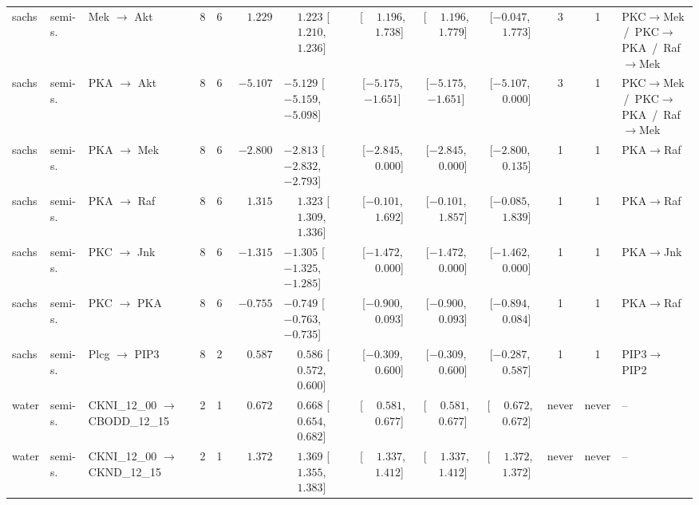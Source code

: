 \begin{landscape}
\begin{longtable}{@{}llp{2.15cm}ccrl cccc c l@{}}
sachs & semi-s. & Mek $\to$ Akt & 8 & 6 & $\phantom{-}1.229$ & $\phantom{-}1.223$ [$\phantom{-}1.210$, $\phantom{-}1.236$] & [$\phantom{-}1.196$, $\phantom{-}1.738$] & [$\phantom{-}1.196$, $\phantom{-}1.779$] & [$-0.047$, $\phantom{-}1.773$] & 3 & 1 & PKC$\to$Mek \,/\, PKC$\to$PKA \,/\, Raf$\to$Mek \\
sachs & semi-s. & PKA $\to$ Akt & 8 & 6 & $-5.107$ & $-5.129$ [$-5.159$, $-5.098$] & [$-5.175$, $-1.651$] & [$-5.175$, $-1.651$] & [$-5.107$, $\phantom{-}0.000$] & 3 & 1 & PKC$\to$Mek \,/\, PKC$\to$PKA \,/\, Raf$\to$Mek \\
sachs & semi-s. & PKA $\to$ Mek & 8 & 6 & $-2.800$ & $-2.813$ [$-2.832$, $-2.793$] & [$-2.845$, $\phantom{-}0.000$] & [$-2.845$, $\phantom{-}0.000$] & [$-2.800$, $\phantom{-}0.135$] & 1 & 1 & PKA$\to$Raf \\
sachs & semi-s. & PKA $\to$ Raf & 8 & 6 & $\phantom{-}1.315$ & $\phantom{-}1.323$ [$\phantom{-}1.309$, $\phantom{-}1.336$] & [$-0.101$, $\phantom{-}1.692$] & [$-0.101$, $\phantom{-}1.857$] & [$-0.085$, $\phantom{-}1.839$] & 1 & 1 & PKA$\to$Raf \\
sachs & semi-s. & PKC $\to$ Jnk & 8 & 6 & $-1.315$ & $-1.305$ [$-1.325$, $-1.285$] & [$-1.472$, $\phantom{-}0.000$] & [$-1.472$, $\phantom{-}0.000$] & [$-1.462$, $\phantom{-}0.000$] & 1 & 1 & PKA$\to$Jnk \\
sachs & semi-s. & PKC $\to$ PKA & 8 & 6 & $-0.755$ & $-0.749$ [$-0.763$, $-0.735$] & [$-0.900$, $\phantom{-}0.093$] & [$-0.900$, $\phantom{-}0.093$] & [$-0.894$, $\phantom{-}0.084$] & 1 & 1 & PKA$\to$Raf \\
sachs & semi-s. & Plcg $\to$ PIP3 & 8 & 2 & $\phantom{-}0.587$ & $\phantom{-}0.586$ [$\phantom{-}0.572$, $\phantom{-}0.600$] & [$-0.309$, $\phantom{-}0.600$] & [$-0.309$, $\phantom{-}0.600$] & [$-0.287$, $\phantom{-}0.587$] & 1 & 1 & PIP3$\to$PIP2 \\
water & semi-s. & CKNI\_\allowbreak{}12\_\allowbreak{}00 $\to$ CBODD\_\allowbreak{}12\_\allowbreak{}15 & 2 & 1 & $\phantom{-}0.672$ & $\phantom{-}0.668$ [$\phantom{-}0.654$, $\phantom{-}0.682$] & [$\phantom{-}0.581$, $\phantom{-}0.677$] & [$\phantom{-}0.581$, $\phantom{-}0.677$] & [$\phantom{-}0.672$, $\phantom{-}0.672$] & never & never & -- \\
water & semi-s. & CKNI\_\allowbreak{}12\_\allowbreak{}00 $\to$ CKND\_\allowbreak{}12\_\allowbreak{}15 & 2 & 1 & $\phantom{-}1.372$ & $\phantom{-}1.369$ [$\phantom{-}1.355$, $\phantom{-}1.383$] & [$\phantom{-}1.337$, $\phantom{-}1.412$] & [$\phantom{-}1.337$, $\phantom{-}1.412$] & [$\phantom{-}1.372$, $\phantom{-}1.372$] & never & never & -- \\

\end{longtable}
\end{landscape}
